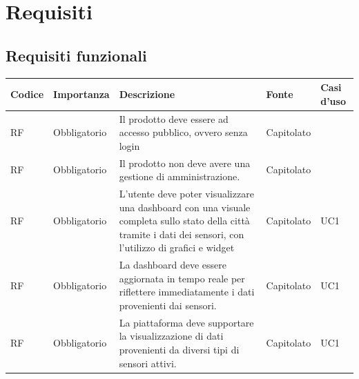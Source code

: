 \documentclass{article}
\begin{document}
\section{Requisiti}
\subsection{Requisiti funzionali}
\begin{longtable}{|C{1cm}|C{2cm}|>{\raggedright}m{5cm}|C{1.5cm}|C{2cm}|}
    \hline
    \textbf{Codice}                                & \textbf{Importanza} & \textbf{Descrizione}                                                                                                                                                                                                               & \textbf{Fonte}  & \textbf{Casi d'uso} \\
    \hline
    RF                          & Obbligatorio        & Il prodotto deve essere ad accesso pubblico, ovvero senza login                                                                                                                                                                    & Capitolato      &                     \\
    \hline
     RF & Obbligatorio        & Il prodotto non deve avere una gestione di amministrazione.                                                                                                                                                                        & Capitolato      &                     \\
    \hline
     RF & Obbligatorio        & L'utente deve poter visualizzare una dashboard con una visuale completa sullo stato della città tramite \newline i dati dei sensori, con l'utilizzo di grafici e widget                                                             & Capitolato      & UC1          \\
    \hline
     RF & Obbligatorio        & La dashboard deve essere aggiornata in tempo reale per riflettere immediatamente i dati provenienti dai sensori.                                                                                                                   & Capitolato      & UC1               \\
    \hline
     RF & Obbligatorio        & La piattaforma deve supportare la visualizzazione di dati provenienti da diversi tipi di sensori attivi.                                                                                                                           & Capitolato      & UC1               \\

\end{longtable}
\end{document}
